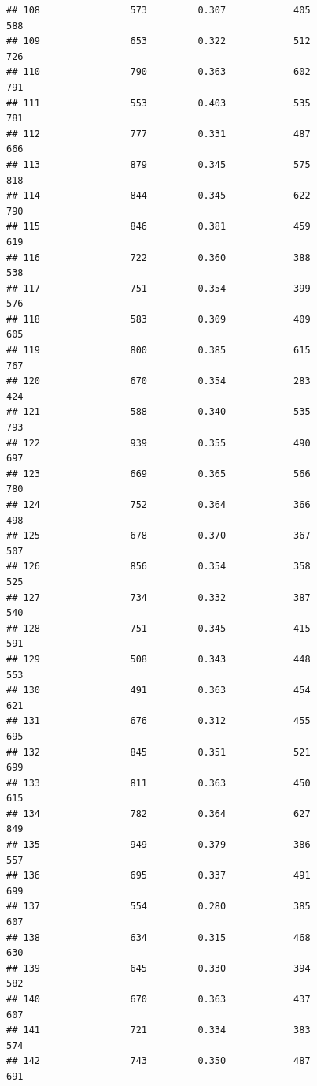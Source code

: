 \documentclass[]{book}
\begin{document}
\begin{verbatim}
## 108                573         0.307            405                 588
## 109                653         0.322            512                 726
## 110                790         0.363            602                 791
## 111                553         0.403            535                 781
## 112                777         0.331            487                 666
## 113                879         0.345            575                 818
## 114                844         0.345            622                 790
## 115                846         0.381            459                 619
## 116                722         0.360            388                 538
## 117                751         0.354            399                 576
## 118                583         0.309            409                 605
## 119                800         0.385            615                 767
## 120                670         0.354            283                 424
## 121                588         0.340            535                 793
## 122                939         0.355            490                 697
## 123                669         0.365            566                 780
## 124                752         0.364            366                 498
## 125                678         0.370            367                 507
## 126                856         0.354            358                 525
## 127                734         0.332            387                 540
## 128                751         0.345            415                 591
## 129                508         0.343            448                 553
## 130                491         0.363            454                 621
## 131                676         0.312            455                 695
## 132                845         0.351            521                 699
## 133                811         0.363            450                 615
## 134                782         0.364            627                 849
## 135                949         0.379            386                 557
## 136                695         0.337            491                 699
## 137                554         0.280            385                 607
## 138                634         0.315            468                 630
## 139                645         0.330            394                 582
## 140                670         0.363            437                 607
## 141                721         0.334            383                 574
## 142                743         0.350            487                 691

\end{verbatim}
\end{document}
